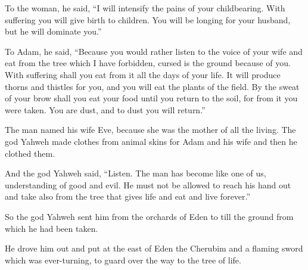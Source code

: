 To the woman, he said, 
\enquote{I will intensify the pains of your childbearing. 
With suffering you will give birth to children. 
You will be longing for your husband, but he will dominate you.} 

To Adam, he said, 
\enquote{Because you would rather listen to the voice of your wife 
and eat from the tree which I have forbidden, 
cursed is the ground because of you. 
With suffering shall you eat from it all the days of your life. 
It will produce thorns and thistles for you, 
and you will eat the plants of the field. 
By the sweat of your brow shall you eat your food 
until you return to the soil, for from it you were taken. 
You are dust, and to dust you will return.}

The man named his wife Eve, because she was the mother of all the living. 
The god Yahweh made clothes from animal skins for Adam and his wife 
and then he clothed them.

And the god Yahweh said, 
\enquote{Listen. 
The man has become like one of us, 
understanding of good and evil. 
He must not be allowed to reach his hand out 
and take also from the tree that gives life and eat and live forever.}

So the god Yahweh sent him from the orchards of Eden 
to till the ground from which he had been taken.

He drove him out and put at the east of Eden
the Cherubim and a flaming sword which was ever-turning, 
to guard over the way to the tree of life.

